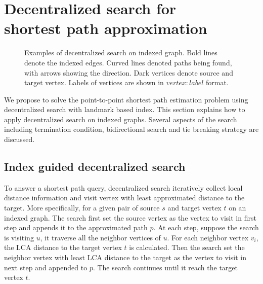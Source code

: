 \section{Decentralized search for \\ shortest path approximation}
\label{searching}

\begin{figure*}[ht]
    \centering
    \caption{Examples of decentralized search on indexed graph. Bold lines denote the indexed edges. Curved lines denoted paths being found, with arrows showing the direction. Dark vertices denote source and target vertex. Labels of vertices are shown in $vertex:label$ format.}
\end{figure*}

We propose to solve the point-to-point shortest path estimation problem using decentralized search with landmark based index. This section explains how to apply decentralized search on indexed graphs. Several aspects of the search including termination condition, bidirectional search and tie breaking strategy are discussed. 

\subsection{Index guided decentralized search}

To answer a shortest path query, decentralized search iteratively collect local distance information and visit vertex with least approximated distance to the target. More specifically, for a given pair of source $s$ and target vertex $t$ on an indexed graph. The search first set the source vertex as the vertex to visit in first step and appends it to the approximated path $p$. At each step, suppose the search is visiting $u$, it traverse all the neighbor vertices of $u$. For each neighbor vertex $v_i$, the LCA distance to the target vertex $t$ is calculated. Then the search set the neighbor vertex with least LCA distance to the target as the vertex to visit in next step and appended to $p$. The search continues until it reach the target vertex $t$.


